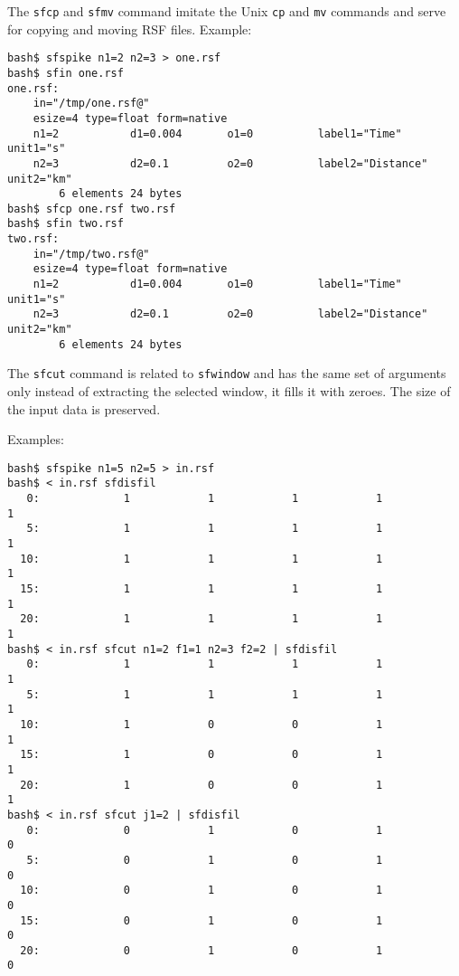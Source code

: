 \noindent\doublebox{\parbox{\textwidth}{

}}

The \texttt{sfcp} and \texttt{sfmv} command imitate the Unix
\texttt{cp} and \texttt{mv} commands and serve for copying and moving
RSF files. Example:
\begin{verbatim}
bash$ sfspike n1=2 n2=3 > one.rsf
bash$ sfin one.rsf
one.rsf:
    in="/tmp/one.rsf@"
    esize=4 type=float form=native
    n1=2           d1=0.004       o1=0          label1="Time" unit1="s"
    n2=3           d2=0.1         o2=0          label2="Distance" unit2="km"
        6 elements 24 bytes
bash$ sfcp one.rsf two.rsf
bash$ sfin two.rsf
two.rsf:
    in="/tmp/two.rsf@"
    esize=4 type=float form=native
    n1=2           d1=0.004       o1=0          label1="Time" unit1="s"
    n2=3           d2=0.1         o2=0          label2="Distance" unit2="km"
        6 elements 24 bytes
\end{verbatim}

\noindent\doublebox{\parbox{\textwidth}{

}}

The \texttt{sfcut} command is related to \texttt{sfwindow} and has the same
set of arguments only instead of extracting the selected window, it fills it
with zeroes. The size of the input data is preserved. 

Examples:
\begin{verbatim}
bash$ sfspike n1=5 n2=5 > in.rsf
bash$ < in.rsf sfdisfil
   0:             1            1            1            1            1
   5:             1            1            1            1            1
  10:             1            1            1            1            1
  15:             1            1            1            1            1
  20:             1            1            1            1            1
bash$ < in.rsf sfcut n1=2 f1=1 n2=3 f2=2 | sfdisfil
   0:             1            1            1            1            1
   5:             1            1            1            1            1
  10:             1            0            0            1            1
  15:             1            0            0            1            1
  20:             1            0            0            1            1
bash$ < in.rsf sfcut j1=2 | sfdisfil
   0:             0            1            0            1            0
   5:             0            1            0            1            0
  10:             0            1            0            1            0
  15:             0            1            0            1            0
  20:             0            1            0            1            0
\end{verbatim}


